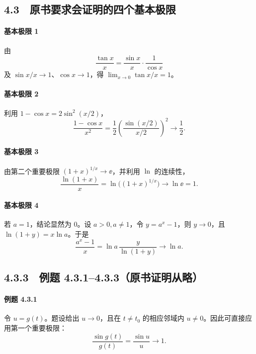 \subsection*{4.3　原书要求会证明的四个基本极限}

\paragraph{基本极限 1}
\begin{xsolution}
由
\[
  \frac{\tan x}{x}=\frac{\sin x}{x}\cdot\frac1{\cos x}
\]
及 $\sin x/x\to1$、$\cos x\to1$，得
$\lim_{x\to0}\tan x/x=1$。
\end{xsolution}

\paragraph{基本极限 2}
\begin{xsolution}
利用 $1-\cos x=2\sin^2(x/2)$，
\[
  \frac{1-\cos x}{x^2}
  =\frac12\left(\frac{\sin(x/2)}{x/2}\right)^2\to\frac12.
\]
\end{xsolution}

\paragraph{基本极限 3}
\begin{xsolution}
由第二个重要极限
$(1+x)^{1/x}\to\ee$，并利用 $\ln$ 的连续性，
\[
  \frac{\ln(1+x)}x
  =\ln\bigl((1+x)^{1/x}\bigr)\to\ln\ee=1.
\]
\end{xsolution}

\paragraph{基本极限 4}
\begin{xsolution}
若 $a=1$，结论显然为 0。设 $a>0,a\ne1$，令 $y=a^x-1$，则 $y\to0$，且
$\ln(1+y)=x\ln a$。于是
\[
  \frac{a^x-1}{x}
  =\ln a\,\frac{y}{\ln(1+y)}\to\ln a.
\]
\end{xsolution}

\subsection*{4.3.3　例题 4.3.1--4.3.3（原书证明从略）}

\paragraph{例题 4.3.1}
\begin{xsolution}
令 $u=g(t)$。题设给出 $u\to0$，且在 $t\ne t_0$ 的相应邻域内 $u\ne0$。因此可直接应用第一个重要极限：
\[
  \frac{\sin g(t)}{g(t)}=\frac{\sin u}{u}\to1.
\]
\end{xsolution}


